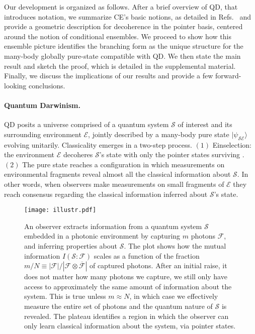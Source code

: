 \documentclass[a4paper,11pt,accepted=2024-09-14]{quantumarticle}
\newcommand{\+}         {\dagger}
\newcommand{\mc}[1]{\mathcal{#1}}
\begin{document}
Our development is organized as follows. After a brief overview of QD, that introduces notation, we summarize CE's basic notions, as detailed in Refs.~\cite{STROCCHI1966,Ashtekar1995,Brody2001,Ashtekar1995,Gibbons1992,Heslot1985,Kibble1979,fabioGQ2,fabioGQ1,fabioGQ3,anza2024maximum} and provide a geometric description for decoherence in the pointer basis, {centered around the notion of conditional ensembles}. We proceed to show how {this ensemble picture} identifies the branching form as the unique structure for the many-body globally pure-state compatible with QD. We then state the main result and sketch the proof, which is detailed in the supplemental material. Finally, we discuss the implications of our results and provide a few forward-looking conclusions.

\paragraph{Quantum Darwinism.} QD posits a universe comprised of a quantum system $\mc{S}$ of interest and its surrounding environment $\mc{E}$, jointly described by a many-body pure state $|\psi_{\mc{SE}}\rangle$ evolving unitarily. Classicality emerges in a two-step process. $\boldsymbol{(\mathfrak{1})}$ Einselection: the environment $\mc{E}$ decoheres $\mc{S}$'s state with only the pointer states surviving \cite{basis1,basis2,zurekhalo}. $\boldsymbol{(\mathfrak{2})}$ The pure state reaches a configuration in which measurements on environmental fragments reveal almost all the classical information about $\mc{S}$. In other words, when observers make measurements on small fragments of $\mc{E}$ they reach consensus regarding the classical information inferred about $\mc{S}$'s state. 

\begin{figure}[h!]
    \texttt{[image: illustr.pdf]}
    \caption{{An observer extracts information from a quantum system $\mathcal{S}$ embedded in a photonic environment by capturing $m$ photons $\mathcal{F}$, and inferring properties about $\mathcal{S}$. The plot shows how the mutual information $I(\mathcal{S}: \mathcal{F})$ scales as a function of the fraction $m / N \equiv|\mathcal{F}| /|\mathcal{F} \otimes \overline{\mathcal{F}}|$ of captured photons. After an initial raise, it does not matter how many photons we capture, we still only have access to approximately the same amount of information about the system. This is true unless $m \approx N$, in which case we effectively measure the entire set of photons and the quantum nature of $\mathcal{S}$ is revealed. The plateau identifies a region in which the observer can only learn classical information about the system, via pointer states.}}
    \label{illust}
\end{figure}
\end{document}
